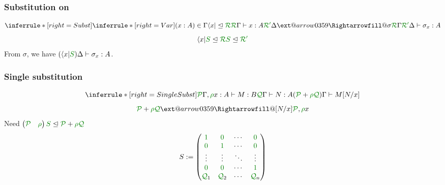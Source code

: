 \documentclass[fleqn]{beamer}
\makeatletter
\newcommand{\subst}[2][]{\ext@arrow 0359\Rightarrowfill@{#1}{#2}}
\makeatother
\begin{document}
\begin{frame}
  \frametitle{Substitution on }
  \[
    \inferrule*[right=Subst]{
      \inferrule*[right=Var]
      {(x : A) \in \Gamma \\ \langle x \rvert \subres \resctx R}
      {\ctx{\Gamma}{R} \vdash x : A}
      \\
      \ctx{\Delta}{R'} \subst{\sigma} \ctx{\Gamma}{R}
    }
    {\ctx{\Delta}{R'} \vdash \sigma_x : A}
  \]
  \begin{displaymath}
    \langle x \rvert\rescomment S
    \subres \resctx R \rescomment S
    \subres \resctx{R'}
  \end{displaymath}
  From $\sigma$, we have
  $(\langle x \rvert\rescomment S)\Delta \vdash \sigma_x : A$.
\end{frame}
\begin{frame}
  \frametitle{Single substitution}
  \[
    \inferrule*[right=SingleSubst]{
      \ctx{\Gamma}{P}, \ctxvar{x}{A}{\rho} \vdash M : B
      \\ \ctx{\Gamma}{Q} \vdash N : A
    }
    {(\resctx P + \rescomment\rho\resctx Q)\Gamma \vdash M[N/x]}
  \]
  \[
    \resctx P + \rescomment\rho\resctx Q \subst{[N/x]} \resctx P, \rescomment\rho x
  \]
  Need $\begin{pmatrix}\resctx P & \rescomment\rho\end{pmatrix}\rescomment S
  \subres \resctx P + \rescomment\rho\resctx Q$
  \[
    S := \begin{pmatrix}
      \rescomment 1 & \rescomment 0 & \cdots & \rescomment 0 \\
      \rescomment 0 & \rescomment 1 & \cdots & \rescomment 0 \\
      \vdots & \vdots & \ddots & \vdots \\
      \rescomment 0 & \rescomment 0 & \cdots & \rescomment 1 \\
      \resctx Q_1 & \resctx Q_2 & \cdots & \resctx Q_n
    \end{pmatrix}
  \]
\end{frame}
\end{document}
